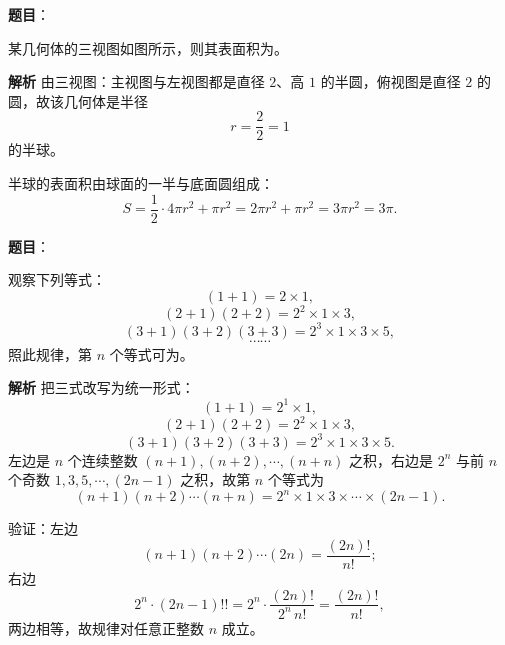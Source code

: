 \begin{answer}

\textbf{题目}：

某几何体的三视图如图所示，则其表面积为\gkblank{}。
\nopagebreak[4]
\begin{center}\end{center}
\nopagebreak[4]
\textbf{解析}
由三视图：主视图与左视图都是直径 $2$、高 $1$ 的半圆，俯视图是直径 $2$ 的圆，故该几何体是半径
\nopagebreak[4]
\[r=\frac22=1\]
的半球。

半球的表面积由球面的一半与底面圆组成：
\nopagebreak[4]
\[S=\frac12\cdot4\pi r^2+\pi r^2=2\pi r^2+\pi r^2=3\pi r^2=3\pi.\]


\end{answer}
\begin{answer}

\textbf{题目}：

观察下列等式：
\nopagebreak[4]
\[(1+1)=2\times1,\]
\nopagebreak[4]
\[(2+1)(2+2)=2^2\times1\times3,\]
\nopagebreak[4]
\[(3+1)(3+2)(3+3)=2^3\times1\times3\times5,\]
\nopagebreak[4]
\[\cdots\cdots\]
照此规律，第 $n$ 个等式可为\gkblank{}。

\textbf{解析}
把三式改写为统一形式：
\nopagebreak[4]
\[(1+1)=2^1\times1,\]
\nopagebreak[4]
\[(2+1)(2+2)=2^2\times1\times3,\]
\nopagebreak[4]
\[(3+1)(3+2)(3+3)=2^3\times1\times3\times5.\]
左边是 $n$ 个连续整数 $(n+1),(n+2),\cdots,(n+n)$ 之积，右边是 $2^n$ 与前 $n$ 个奇数 $1,3,5,\cdots,(2n-1)$ 之积，故第 $n$ 个等式为
\nopagebreak[4]
\[(n+1)(n+2)\cdots(n+n)=2^n\times1\times3\times\cdots\times(2n-1).\]

验证：左边
\nopagebreak[4]
\[(n+1)(n+2)\cdots(2n)=\frac{(2n)!}{n!};\]
右边
\nopagebreak[4]
\[2^n\cdot(2n-1)!!=2^n\cdot\frac{(2n)!}{2^n\,n!}=\frac{(2n)!}{n!},\]
两边相等，故规律对任意正整数 $n$ 成立。


\end{answer}
